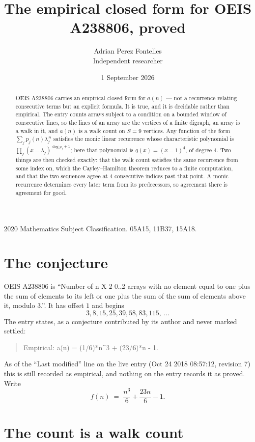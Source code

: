 \documentclass[11pt,a4paper]{article}
\title{The empirical closed form for OEIS A238806, proved}
\author{Adrian Perez Fontelles\\ \small Independent researcher}
\date{1 September 2026}
\theoremstyle{plain}
\theoremstyle{definition}
\begin{document}
\maketitle

\begin{abstract}
OEIS A238806 carries an empirical closed form for $a(n)$ --- not a recurrence relating
consecutive terms but an explicit formula. It is true, and it is decidable rather than
empirical. The entry counts arrays subject to a condition on a bounded window of consecutive lines, so the lines of an array are the
vertices of a finite digraph, an array is a walk in it, and $a(n)$ is a walk count on
$S=9$ vertices. Any function of the form $\sum_j p_j(n)\lambda_j^{\,n}$ satisfies the
monic linear recurrence whose characteristic polynomial is
$\prod_j(x-\lambda_j)^{\deg p_j+1}$; here that polynomial is $q(x)=(x-1)^{4}$, of degree
$4$. Two things are then checked exactly: that the walk count satisfies the same
recurrence from some index on, which the Cayley--Hamilton theorem reduces to a finite
computation, and that the two sequences agree at $4$ consecutive indices past that
point. A monic recurrence determines every later term from its predecessors, so agreement
there is agreement for good.
\end{abstract}

\noindent\small 2020 Mathematics Subject Classification. 05A15, 11B37, 15A18.\normalsize

\section{The conjecture}

OEIS A238806 is ``Number of n X 2 0..2 arrays with no element equal to one plus the sum of elements to its left or one plus the sum of the sum of elements above it, modulo 3.''. It has offset $1$ and begins
\[
3, 8, 15, 25, 39, 58, 83, 115,\ \dots
\]
The entry states, as a conjecture contributed by its author and never marked settled:
\begin{quote}
Empirical: a(n) = (1/6)*n\^{}3 + (23/6)*n - 1.
\end{quote}
As of the ``Last modified'' line on the live entry (Oct 24 2018 08:57:12, revision 7) this is still
recorded as empirical, and nothing on the entry records it as proved. Write
\[
f(n)\;=\;\frac{n^{3}}{6} + \frac{23 n}{6} - 1.
\]

\section{The count is a walk count}
\end{document}
